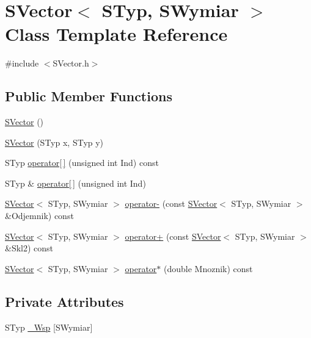 \hypertarget{classSVector}{}\section{S\+Vector$<$ S\+Typ, S\+Wymiar $>$ Class Template Reference}
\label{classSVector}


{\ttfamily \#include $<$S\+Vector.\+h$>$}

\subsection*{Public Member Functions}
\begin{DoxyCompactItemize}
\item 
\hyperlink{classSVector_abfa8373f84e633e4e3e1809872a8407e}{S\+Vector} ()
\item 
\hyperlink{classSVector_a73f43519424798b4987b2c462798817e}{S\+Vector} (S\+Typ x, S\+Typ y)
\item 
S\+Typ \hyperlink{classSVector_a1791455c796655130e02fddab501c0d5}{operator\mbox{[}$\,$\mbox{]}} (unsigned int Ind) const
\item 
S\+Typ \& \hyperlink{classSVector_ad45c95945940a25c4d9bbb7c7eca6226}{operator\mbox{[}$\,$\mbox{]}} (unsigned int Ind)
\item 
\hyperlink{classSVector}{S\+Vector}$<$ S\+Typ, S\+Wymiar $>$ \hyperlink{classSVector_a55a33376410034fd14e7534f0544d0ee}{operator-\/} (const \hyperlink{classSVector}{S\+Vector}$<$ S\+Typ, S\+Wymiar $>$ \&Odjemnik) const
\item 
\hyperlink{classSVector}{S\+Vector}$<$ S\+Typ, S\+Wymiar $>$ \hyperlink{classSVector_ab953dcf9cd5c055a6220181472e1c143}{operator+} (const \hyperlink{classSVector}{S\+Vector}$<$ S\+Typ, S\+Wymiar $>$ \&Skl2) const
\item 
\hyperlink{classSVector}{S\+Vector}$<$ S\+Typ, S\+Wymiar $>$ \hyperlink{classSVector_a8a915532614341a6365ddb74b1eca496}{operator$\ast$} (double Mnoznik) const
\end{DoxyCompactItemize}
\subsection*{Private Attributes}
\begin{DoxyCompactItemize}
\item 
S\+Typ \hyperlink{classSVector_abbb1d8aef561cf02a7071e79b7f17134}{\+\_\+\+Wsp} \mbox{[}S\+Wymiar\mbox{]}
\end{DoxyCompactItemize}


